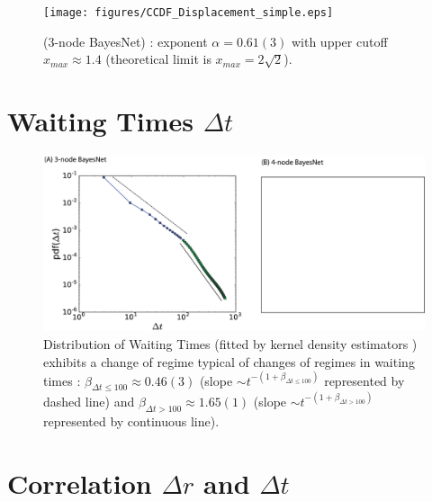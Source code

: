 \begin{figure}[h!]
\begin{center}
\texttt{[image: figures/CCDF\_Displacement\_simple.eps]}
\caption{(3-node BayesNet) : exponent $\alpha = 0.61(3)$ with upper cutoff  $x_{max} \approx 1.4$ (theoretical limit is $x_{max} = 2\sqrt{2}$).}
\label{fig:jump_sizes}
\end{center}
\end{figure}


\section{Waiting Times $\Delta t$}



\begin{figure}[h!]
\begin{center}
\includegraphics[width=15cm]{figures/dt_kernel_SI.eps}
\caption{Distribution of Waiting Times (fitted by kernel density estimators \cite{}) exhibits a change of regime typical of changes of regimes in waiting times \cite{maillart2011,saichevTheory}: $\beta_{\Delta t  \leqslant 100} \approx 0.46(3)$ (slope $\sim t^{-(1+ \beta_{\Delta t  \leqslant 100})}$ represented by dashed line) and $\beta_{\Delta t > 100} \approx 1.65(1)$ (slope $\sim t^{-(1+ \beta_{\Delta t  > 100})}$ represented by continuous line).}
\label{fig:waiting_times}
\end{center}
\end{figure}


\section{Correlation $\Delta r$ and $\Delta t$}
\label{si:corr_dr_dt}


